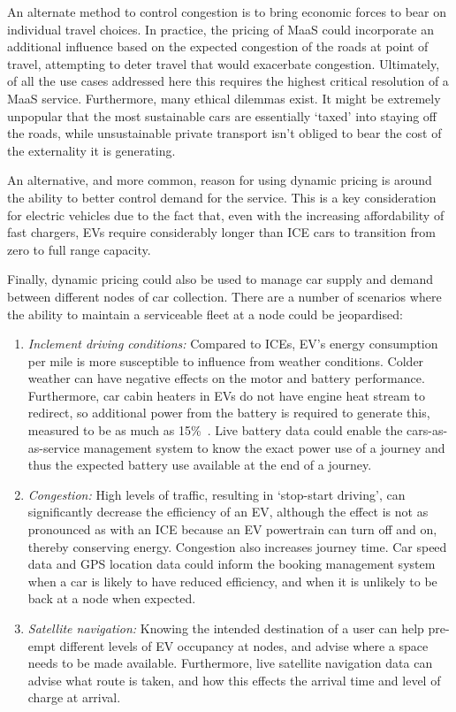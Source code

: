 \documentclass[b5paper,10pt]{article}
\begin{document}
An alternate method to control congestion is to bring economic forces
to bear on individual travel choices. In practice, the pricing of MaaS
could incorporate an additional influence based on the expected
congestion of the roads at point of travel, attempting to deter travel
that would exacerbate congestion. Ultimately, of all the use cases
addressed here this requires the highest critical resolution of a MaaS
service. Furthermore, many ethical dilemmas exist. It might be
extremely unpopular that the most sustainable cars are essentially
`taxed' into staying off the roads, while unsustainable private
transport isn't obliged to bear the cost of the externality it is
generating.

An alternative, and more common, reason for using dynamic pricing is
around the ability to better control demand for the service. This is a
key consideration for electric vehicles due to the fact that, even
with the increasing affordability of fast chargers, EVs require
considerably longer than ICE cars to transition from zero to full
range capacity.

Finally, dynamic pricing could also be used to manage car supply and
demand between different nodes of car collection. There are a number
of scenarios where the ability to maintain a serviceable fleet at a
node could be jeopardised:

\begin{enumerate}
\item {\emph{Inclement driving conditions:}} Compared to ICEs, EV's
energy consumption per mile is more susceptible to influence from
weather conditions. Colder weather can have negative effects on the
motor and battery performance. Furthermore, car cabin heaters in EVs
do not have engine heat stream to redirect, so additional power from
the battery is required to generate this, measured to be as much as
15\%~\citep{dft:2008,brook:2015}. Live battery data could enable the
cars-as-as-service management system to know the exact power use of a
journey and thus the expected battery use available at the end of a
journey.
\item {\emph{Congestion:}} High levels of traffic, resulting in
`stop-start driving', can significantly decrease the efficiency of an
EV, although the effect is not as pronounced as with an ICE because an EV
powertrain can turn off and on, thereby conserving energy. Congestion also
increases journey time. Car speed data and GPS location data could
inform the booking management system when a car is likely to have
reduced efficiency, and when it is unlikely to be back at a node when
expected.
\item {\emph{Satellite navigation:}} Knowing the intended destination
of a user can help pre-empt different levels of EV occupancy at nodes,
and advise where a space needs to be made available. Furthermore, live
satellite navigation data can advise what route is taken, and how this
effects the arrival time and level of charge at arrival.
\end{enumerate}
\end{document}
